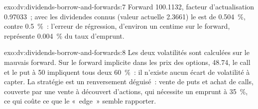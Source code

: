 \begin{solution}{exo:dv:dividends-borrow-and-forwards:7}
Forward 100.1132, facteur d'actualisation 0.97033~; avec les dividendes connus (valeur actuelle 2.3661)
le  est de 0.504~\%, contre 0.5~\%~: l'erreur de régression, d'environ un centime sur le
forward, représente 0.004~\% du taux d'emprunt.
\end{solution}

\begin{solution}{exo:dv:dividends-borrow-and-forwards:8}
Les deux volatilités sont calculées sur le mauvais forward. Sur le forward implicite dans les prix des options,
48.74, le call et le put à 50 impliquent tous deux 60~\%~: il n'existe aucun écart de volatilité à
capter. La stratégie est un renversement déguisé~: vente de puts et achat de calls, couverte par
une vente à découvert d'actions, qui nécessite un emprunt à 35~\%, ce qui coûte ce que le «~edge~» semble rapporter.
\end{solution}

